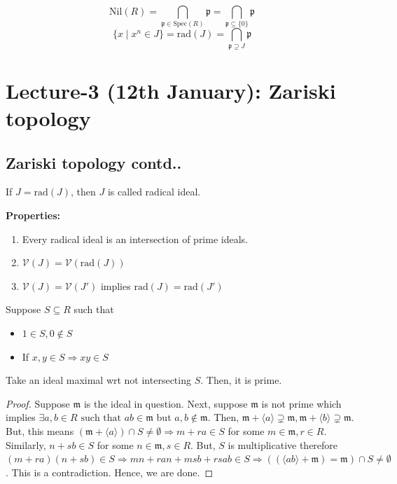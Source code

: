 \documentclass[oneside, 12pt, ]{scrbook}
\newcommand{\V}{\mathcal{V}}
\newcommand{\spec}{\mathrm{Spec}}
\newcommand{\pr}{\mathfrak{p}}
\newcommand{\m}{\mathfrak{m}}
\newcommand{\nil}{\mathrm{Nil}}
\theoremstyle{theorem}
\begin{document}
$$\nil (R) = \bigcap_{\pr \in \spec (R)} \pr = \bigcap_{\pr \subseteq \{0\}} \pr$$
$$\{x \mid x^n \in J\} = \mathrm{rad}(J) = \bigcap_{\pr \supseteq J} \pr $$

\chapter{Lecture-3 (12th January): Zariski topology }

\section{Zariski topology contd..}

\begin{definition}
If $J = \mathrm{rad}(J)$, then $J$ is called radical ideal.
\end{definition}

\textbf{Properties:}
\begin{enumerate}
\item Every radical ideal is an intersection of prime ideals.
\item $\V(J) = \V(\mathrm{rad}(J))$ 
\item $\V(J) = \V(J')$ implies $\mathrm{rad}(J) = \mathrm{rad}(J')$
\end{enumerate}

Suppose $S\subseteq R$ such that 
\begin{itemize}
\item $1\in S, 0 \not \in S$
\item If $x,y \in S \Rightarrow xy \in S$
\end{itemize}

\begin{proposition}
Take an ideal maximal wrt not intersecting $S$. Then, it is prime.
\end{proposition}

\begin{proof}
Suppose $\m$ is the ideal in question. Next, suppose $\m$ is not prime which implies  $\exists a,b \in R \text{ such that } ab \in \m$ but $a,b \not \in \m$. Then, $\m + \langle a \rangle \supsetneq \m , \m + \langle b \rangle \supsetneq \m$. But, this means $(\m + \langle a \rangle) \cap S \neq \emptyset \Rightarrow m + ra \in S$ for some $m\in \m , r  \in R$. Similarly, $n + sb \in S$ for some $n \in \m , s \in R$. But, $S$ is multiplicative therefore $(m+ra)(n + sb) \in S \Rightarrow mn + ran + msb + rsab \in S \Rightarrow ((\langle ab \rangle + \m)= \m) \cap S \neq \emptyset$. This is a contradiction. Hence, we are done.  
\end{proof}
\end{document}
